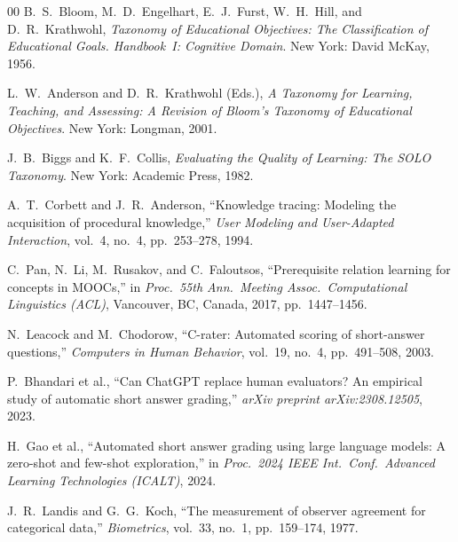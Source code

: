 \documentclass[conference]{IEEEtran}
\begin{document}
\begin{thebibliography}{00}
B.~S.~Bloom, M.~D.~Engelhart, E.~J.~Furst, W.~H.~Hill, and D.~R.~Krathwohl,
\textit{Taxonomy of Educational Objectives: The Classification of Educational Goals.
Handbook~I: Cognitive Domain}.
New York: David McKay, 1956.

L.~W.~Anderson and D.~R.~Krathwohl (Eds.),
\textit{A Taxonomy for Learning, Teaching, and Assessing: A Revision of Bloom's
Taxonomy of Educational Objectives}.
New York: Longman, 2001.

J.~B.~Biggs and K.~F.~Collis,
\textit{Evaluating the Quality of Learning: The SOLO Taxonomy}.
New York: Academic Press, 1982.

A.~T.~Corbett and J.~R.~Anderson,
``Knowledge tracing: Modeling the acquisition of procedural knowledge,''
\textit{User Modeling and User-Adapted Interaction}, vol.~4, no.~4,
pp.~253--278, 1994.

C.~Pan, N.~Li, M.~Rusakov, and C.~Faloutsos,
``Prerequisite relation learning for concepts in MOOCs,''
in \textit{Proc.\ 55th Ann.\ Meeting Assoc.\ Computational Linguistics (ACL)},
Vancouver, BC, Canada, 2017, pp.~1447--1456.

N.~Leacock and M.~Chodorow,
``C-rater: Automated scoring of short-answer questions,''
\textit{Computers in Human Behavior}, vol.~19, no.~4,
pp.~491--508, 2003.

P.~Bhandari et al.,
``Can ChatGPT replace human evaluators? An empirical study of automatic
short answer grading,''
\textit{arXiv preprint arXiv:2308.12505}, 2023.

H.~Gao et al.,
``Automated short answer grading using large language models: A zero-shot
and few-shot exploration,''
in \textit{Proc.\ 2024 IEEE Int.\ Conf.\ Advanced Learning Technologies (ICALT)},
2024.

J.~R.~Landis and G.~G.~Koch,
``The measurement of observer agreement for categorical data,''
\textit{Biometrics}, vol.~33, no.~1, pp.~159--174, 1977.

\end{thebibliography}
\end{document}
